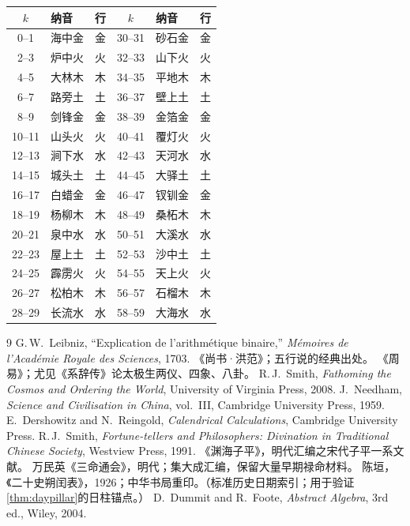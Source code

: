 \documentclass[11pt,a4paper,fontset=none]{ctexart}
\theoremstyle{definition}
\theoremstyle{remark}
\begin{document}
\begin{center}\footnotesize
\begin{tabular}{c|l|c||c|l|c}
\hline
$k$ & 纳音 & 行 & $k$ & 纳音 & 行\\ \hline
0--1   & 海中金 & 金 & 30--31 & 砂石金 & 金\\
2--3   & 炉中火 & 火 & 32--33 & 山下火 & 火\\
4--5   & 大林木 & 木 & 34--35 & 平地木 & 木\\
6--7   & 路旁土 & 土 & 36--37 & 壁上土 & 土\\
8--9   & 剑锋金 & 金 & 38--39 & 金箔金 & 金\\
10--11 & 山头火 & 火 & 40--41 & 覆灯火 & 火\\
12--13 & 涧下水 & 水 & 42--43 & 天河水 & 水\\
14--15 & 城头土 & 土 & 44--45 & 大驿土 & 土\\
16--17 & 白蜡金 & 金 & 46--47 & 钗钏金 & 金\\
18--19 & 杨柳木 & 木 & 48--49 & 桑柘木 & 木\\
20--21 & 泉中水 & 水 & 50--51 & 大溪水 & 水\\
22--23 & 屋上土 & 土 & 52--53 & 沙中土 & 土\\
24--25 & 霹雳火 & 火 & 54--55 & 天上火 & 火\\
26--27 & 松柏木 & 木 & 56--57 & 石榴木 & 木\\
28--29 & 长流水 & 水 & 58--59 & 大海水 & 水\\ \hline
\end{tabular}
\end{center}

\clearpage
\begin{thebibliography}{9}
 G.\,W.~Leibniz, ``Explication de l'arithm\'etique binaire,'' \emph{M\'emoires de l'Acad\'emie Royale des Sciences}, 1703.
 《尚书·洪范》；五行说的经典出处。
 《周易》；尤见《系辞传》论太极生两仪、四象、八卦。
 R.\,J.~Smith, \emph{Fathoming the Cosmos and Ordering the World}, University of Virginia Press, 2008.
 J.~Needham, \emph{Science and Civilisation in China}, vol.\ III, Cambridge University Press, 1959.
 E.~Dershowitz and N.~Reingold, \emph{Calendrical Calculations}, Cambridge University Press.
 R.\,J.~Smith, \emph{Fortune-tellers and Philosophers: Divination in Traditional Chinese Society}, Westview Press, 1991.
 《渊海子平》，明代汇编之宋代子平一系文献。
 万民英《三命通会》，明代；集大成汇编，保留大量早期禄命材料。
 陈垣，《二十史朔闰表》，1926；中华书局重印。（标准历史日期索引；用于验证\cref{thm:daypillar}的日柱锚点。）
 D.~Dummit and R.~Foote, \emph{Abstract Algebra}, 3rd ed., Wiley, 2004.
\end{thebibliography}
\end{document}
